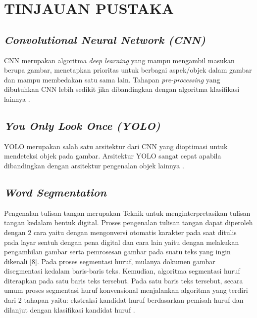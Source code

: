 \section{TINJAUAN PUSTAKA}

\subsection{\textit{Convolutional  Neural Network (CNN)}}
CNN merupakan algoritma \textit{deep learning} yang mampu mengambil masukan berupa gambar, menetapkan prioritas untuk berbagai aspek/objek dalam gambar dan mampu membedakan satu sama lain. Tahapan \textit{pre-processing} yang dibutuhkan CNN lebih sedikit jika dibandingkan dengan algoritma klasifikasi lainnya \citep*{towardsDS}.


\subsection{\textit{You Only Look Once (YOLO)}}
YOLO merupakan salah satu arsitektur dari CNN yang dioptimasi untuk mendeteksi objek pada gambar. Arsitektur YOLO sangat cepat apabila dibandingkan dengan arsitektur pengenalan objek lainnya \citep*{jeong2018image}. 


\subsection{\textit{Word Segmentation}}
Pengenalan tulisan tangan merupakan Teknik untuk menginterpretasikan tulisan tangan kedalam bentuk digital. Proses pengenalan tulisan tangan dapat diperoleh dengan 2 cara yaitu dengan mengonversi otomatis karakter pada saat ditulis pada layar sentuh dengan pena digital dan cara lain yaitu dengan melakukan pengambilan gambar serta pemrosesan gambar pada suatu teks yang ingin dikenali [8]. Pada proses segmentasi huruf, mulanya dokumen gambar disegmentasi kedalam baris-baris teks. Kemudian, algoritma segmentasi huruf diterapkan pada satu baris teks tersebut. Pada satu baris teks tersebut, secara umum proses segmentasi huruf konvensional menjalankan algoritma yang terdiri dari 2 tahapan yaitu: ekstraksi kandidat huruf berdasarkan pemisah huruf dan dilanjut dengan klasifikasi kandidat huruf \citep*{ryu2015word}.

